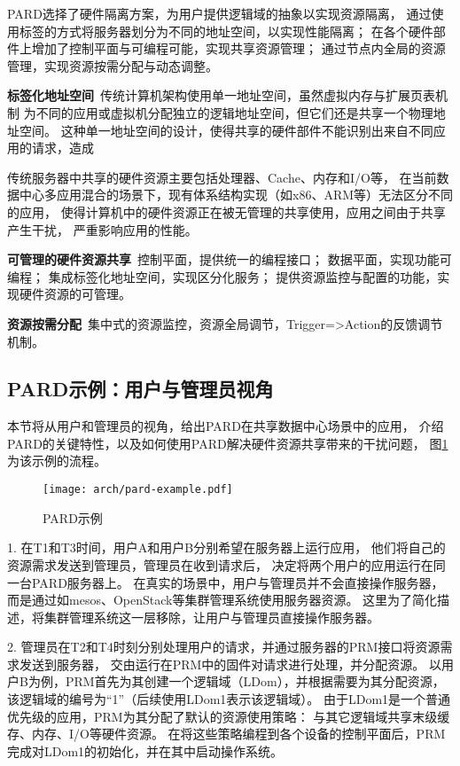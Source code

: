 PARD选择了硬件隔离方案，为用户提供逻辑域的抽象以实现资源隔离，
通过使用标签的方式将服务器划分为不同的地址空间，以实现性能隔离；
在各个硬件部件上增加了控制平面与可编程可能，实现共享资源管理；
通过节点内全局的资源管理，实现资源按需分配与动态调整。


\textbf{标签化地址空间}\ 传统计算机架构使用单一地址空间，虽然虚拟内存与扩展页表机制
为不同的应用或虚拟机分配独立的逻辑地址空间，但它们还是共享一个物理地址空间。
这种单一地址空间的设计，使得共享的硬件部件不能识别出来自不同应用的请求，造成

传统服务器中共享的硬件资源主要包括处理器、Cache、内存和I/O等，
在当前数据中心多应用混合的场景下，现有体系结构实现（如x86、ARM等）无法区分不同的应用，
使得计算机中的硬件资源正在被无管理的共享使用，应用之间由于共享产生干扰，
严重影响应用的性能。

\textbf{可管理的硬件资源共享}\ 控制平面，提供统一的编程接口；
数据平面，实现功能可编程；
集成标签化地址空间，实现区分化服务；
提供资源监控与配置的功能，实现硬件资源的可管理。

\textbf{资源按需分配}\ 集中式的资源监控，资源全局调节，Trigger=>Action的反馈调节机制。


\subsection{PARD示例：用户与管理员视角}

本节将从用户和管理员的视角，给出PARD在共享数据中心场景中的应用，
介绍PARD的关键特性，以及如何使用PARD解决硬件资源共享带来的干扰问题，
图\ref{fig:pard-example}为该示例的流程。

\begin{figure}[htb]
  \centering
  \texttt{[image: arch/pard-example.pdf]}
  \caption{PARD示例}
  \label{fig:pard-example}
\end{figure}

1. 在T1和T3时间，用户A和用户B分别希望在服务器上运行应用，
他们将自己的资源需求发送到管理员，管理员在收到请求后，
决定将两个用户的应用运行在同一台PARD服务器上。
在真实的场景中，用户与管理员并不会直接操作服务器，
而是通过如mesos\cite{}、OpenStack\cite{}等集群管理系统使用服务器资源。
这里为了简化描述，将集群管理系统这一层移除，让用户与管理员直接操作服务器。

2. 管理员在T2和T4时刻分别处理用户的请求，并通过服务器的PRM接口将资源需求发送到服务器，
交由运行在PRM中的固件对请求进行处理，并分配资源。
以用户B为例，PRM首先为其创建一个逻辑域（LDom），并根据需要为其分配资源，
该逻辑域的编号为“1”（后续使用LDom1表示该逻辑域）。
由于LDom1是一个普通优先级的应用，PRM为其分配了默认的资源使用策略：
与其它逻辑域共享末级缓存、内存、I/O等硬件资源。
在将这些策略编程到各个设备的控制平面后，PRM完成对LDom1的初始化，并在其中启动操作系统。

